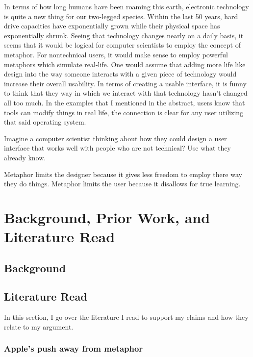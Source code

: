 \documentclass[11pt, oneside]{article}   	%
\begin{document}
In terms of how long humans have been roaming this earth, electronic technology is quite a new thing for our two-legged species. Within the last 50 years, hard drive capacities have exponentially grown while their physical space has exponentially shrunk. Seeing that technology changes nearly on a daily basis, it seems that it would be logical for computer scientists to employ the concept of metaphor. For nontechnical users, it would make sense to employ powerful metaphors which simulate real-life. One would assume that adding more life like design into the way someone interacts with a given piece of technology would increase their overall usability. In terms of creating a usable interface, it is funny to think that they way in which we interact with that technology hasn't changed all too much. In the examples that I mentioned in the abstract, users know that tools can modify things in real life, the connection is clear for any user utilizing that said operating system.

Imagine a computer scientist thinking about how they could design a user interface that works well with people who are not technical? Use what they already know. 

Metaphor limits the designer because it gives less freedom to employ there way they do things. Metaphor limits the user because it disallows for true learning.
\cite{ars-technica-mavericks}

\cite{bae16}

\section{Background, Prior Work, and Literature Read}

\subsection{Background}

\subsection{Literature Read}

In this section, I go over the literature I read to support my claims and how they relate to my argument.

\subsubsection{Apple's push away from metaphor}
\end{document}
